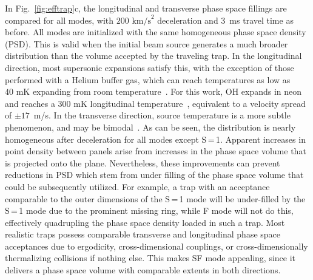 \documentclass[%
 reprint,
 amsmath,amssymb,
 aps,
prl,
]{revtex4-1}
\begin{document}
In Fig.~\ref{fig:efftrap}c, the longitudinal and transverse phase space fillings are compared for all modes, with $200\text{ km/s}^2$ deceleration and $3$~ms travel time as before. 
All modes are initialized with the same homogeneous phase space density (PSD).
This is valid when the initial beam source generates a much broader distribution than the volume accepted by the traveling trap.
In the longitudinal direction, most supersonic expansions satisfy this, with the exception of those performed with a Helium buffer gas, which can reach temperatures as low as $40\text{ mK}$ expanding from room temperature~\cite{Even2014}.
For this work, OH expands in neon and reaches a $300\text{ mK}$ longitudinal temperature~\cite{Wu2018}, equivalent to a velocity spread of $\pm17$~m/s.
In the transverse direction, source temperature is a more subtle phenomenon, and may be bimodal~\cite{Beijerinck1981}.
As can be seen, the distribution is nearly homogeneous after deceleration for all modes except S\,=\,1.
Apparent increases in point density between panels arise from increases in the phase space volume that is projected onto the plane.
Nevertheless, these improvements can prevent reductions in PSD which stem from under filling of the phase space volume that could be subsequently utilized.
For example, a trap with an acceptance comparable to the outer dimensions of the S\,=\,1 mode will be under-filled by the S\,=\,1 mode due to the prominent missing ring, while F mode will not do this, effectively quadrupling the phase space density loaded in such a trap.
Most realistic traps possess comparable transverse and longitudinal phase space acceptances due to ergodicity, cross-dimensional couplings, or cross-dimensionally thermalizing collisions if nothing else.
This makes SF mode appealing, since it delivers a phase space volume with comparable extents in both directions.
\end{document}
